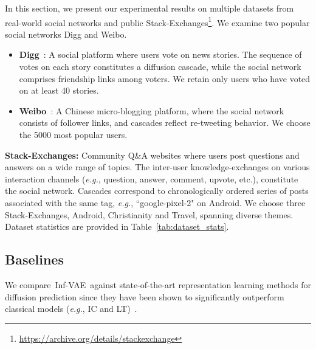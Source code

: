 \documentclass[sigconf]{acmart}
\newcommand{\name}{Inf-VAE}
\begin{document}
In this section, we present our experimental results on multiple datasets from real-world social networks and public Stack-Exchanges\footnote{\url{https://archive.org/details/stackexchange}}. We examine two popular social networks Digg and Weibo. \begin{itemize}[leftmargin=*]
\item \textbf{Digg}~\cite{digg}: A social platform where users vote on news stories.
The sequence of votes on each story constitutes a diffusion cascade, while the social network comprises friendship links among voters.
We retain only users who have voted on at least 40 stories.



\item \textbf{Weibo}~\cite{locality}: A Chinese micro-blogging platform,
where the social network consists of follower links, and cascades reflect re-tweeting behavior. We choose the 5000 most popular users. 

\end{itemize}
\textbf{Stack-Exchanges:} Community Q\&A websites where users post questions and answers on a wide range of topics.
The inter-user knowledge-exchanges on various interaction channels (\textit{e.g.}, question, answer, comment, upvote, etc.), constitute the social network.
Cascades correspond to chronologically ordered series of posts associated with the same tag, \textit{e.g.}, ``google-pixel-2" on Android.
We choose three Stack-Exchanges, Android, Christianity and Travel, spanning diverse themes.
Dataset statistics are provided in Table~\ref{tab:dataset_stats}.

\subsection{Baselines}
We compare~\name~against state-of-the-art representation learning methods for diffusion prediction since they have been shown to significantly outperform classical models (\textit{e.g.}, IC and LT)~\cite{topolstm, inf2vec}.
\end{document}
